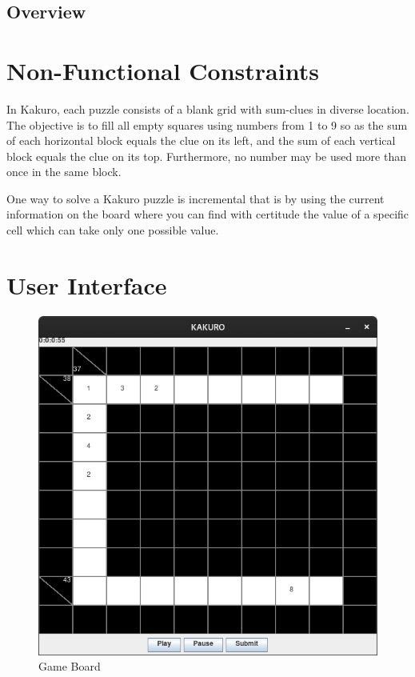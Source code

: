 \documentclass[12pt]{article}
\begin{document}
\newpage

\subsection{Overview}

\section{Non-Functional Constraints}

In Kakuro, each puzzle consists of a blank grid with sum-clues in diverse location. The objective is to fill all empty squares using numbers from 1 to 9 so as the sum of each horizontal block equals the clue on its left, and the sum of each vertical block equals the clue on its top. Furthermore, no number may be used more than once in the same block.

One way to solve a Kakuro puzzle is incremental that is by using the current information on the board where you can find with certitude the value of a specific cell which can take only one possible value.

\section{User Interface}
\begin{figure}[htbp]
    \centering
    \includegraphics[scale=0.4]{iteration1/images/UI1.png}
    \caption{Game Board}
    \label{fig:Game Board}
\end{figure}
\end{document}
